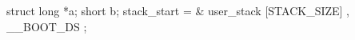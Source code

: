\documentclass[varwidth=29em,crop]{standalone}
\begin{document}
\begin{ccode}
struct {
    long *a;
    short b;
} stack_start = { & user_stack [STACK_SIZE] , __BOOT_DS };
\end{ccode}
\end{document}
